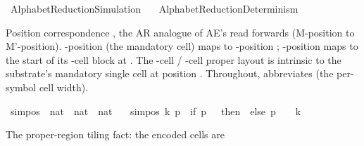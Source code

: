 %
\begin{isabellebody}%
%
%
\isadelimtheory
%
\endisadelimtheory
%
\isatagtheory
{}\isamarkupfalse%
\ AlphabetReduction{\isacharunderscore}{\kern0pt}Simulation\isanewline
\ \ \ AlphabetReduction{\isacharunderscore}{\kern0pt}Determinism\isanewline
{}%
\endisatagtheory
{\isafoldtheory}%
%
\isadelimtheory
%
\endisadelimtheory
%
\isadelimdocument
%
\endisadelimdocument
%
\isatagdocument
%
\isamarkuptrue%
%
\endisatagdocument
{\isafolddocument}%
%
\isadelimdocument
%
\endisadelimdocument
%
\begin{isamarkuptext}%
Position correspondence , the AR analogue of
  AE's  read forwards (M-position to
  M'-position).  -position  (the mandatory
   cell) maps to -position ;
  -position  maps to the start of its
  -cell block at .  The
  -cell  / -cell proper layout
  is intrinsic to the substrate's mandatory single 
  cell at position .
  Throughout,  abbreviates  (the per-symbol cell width).%
\end{isamarkuptext}\isamarkuptrue%
\isamarkupfalse%
\ sim{\isacharunderscore}{\kern0pt}pos\ {\isacharcolon}{\kern0pt}{\isacharcolon}{\kern0pt}\ {\isachardoublequoteopen}nat\ {\isasymRightarrow}\ nat\ {\isasymRightarrow}\ nat{\isachardoublequoteclose}\ \isanewline
\ \ {\isachardoublequoteopen}sim{\isacharunderscore}{\kern0pt}pos\ k\ p\ {\isacharequal}{\kern0pt}\ {\isacharparenleft}{\kern0pt}if\ p\ {\isacharequal}{\kern0pt}\ {}\ then\ {}\ else\ {\isacharparenleft}{\kern0pt}p\ {\isacharminus}{\kern0pt}\ {}{\isacharparenright}{\kern0pt}\ {\isacharasterisk}{\kern0pt}\ k\ {\isacharplus}{\kern0pt}\ {}{\isacharparenright}{\kern0pt}{\isachardoublequoteclose}%
\begin{isamarkuptext}%
The proper-region tiling fact: the encoded cells are

\end{isamarkuptext}
\end{isabellebody}

